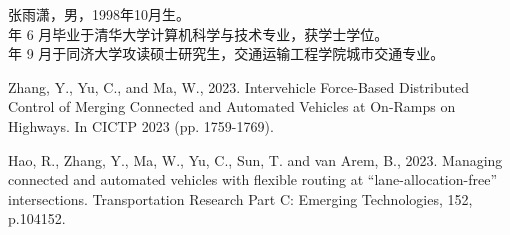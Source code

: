 \noindent 张雨潇，男，1998年10月生。\\
 年 6 月毕业于清华大学计算机科学与技术专业，获学士学位。\\
 年 9 月于同济大学攻读硕士研究生，交通运输工程学院城市交通专业。

\begin{enumerate}[{[}1{]}]
  \item Zhang, Y., Yu, C., and Ma, W., 2023. Intervehicle Force-Based Distributed Control of Merging Connected and Automated Vehicles at On-Ramps on Highways. In CICTP 2023 (pp. 1759-1769).
  \item Hao, R., Zhang, Y., Ma, W., Yu, C., Sun, T. and van Arem, B., 2023. Managing connected and automated vehicles with flexible routing at “lane-allocation-free” intersections. Transportation Research Part C: Emerging Technologies, 152, p.104152.
\end{enumerate}

